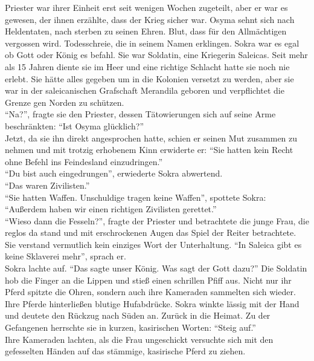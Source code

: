 Priester war ihrer Einheit erst seit wenigen Wochen zugeteilt, aber er war es gewesen, der ihnen 
erzählte, dass der Krieg sicher war. Osyma sehnt sich nach Heldentaten, nach sterben zu seinen 
Ehren. Blut, dass für den Allmächtigen vergossen wird. Todesschreie, die in seinem Namen erklingen. 
Sokra war es egal ob Gott oder König es befahl. Sie war Soldatin, eine Kriegerin Saleicas. Seit 
mehr als 15 Jahren diente sie im Heer und eine richtige Schlacht hatte sie noch nie erlebt. Sie 
hätte alles gegeben um in die Kolonien versetzt zu werden, aber sie war in der saleicanischen 
Grafschaft Merandila geboren und verpflichtet die Grenze gen Norden zu schützen.\\
``Na?'', fragte sie den Priester, dessen Tätowierungen sich auf seine Arme beschränkten: ``Ist 
Osyma glücklich?''\\
Jetzt, da sie ihn direkt angesprochen hatte, schien er seinen Mut zusammen zu nehmen und mit 
trotzig erhobenem Kinn erwiderte er: ``Sie hatten kein Recht ohne Befehl ins Feindesland 
einzudringen.''\\
``Du bist auch eingedrungen'', erwiederte Sokra abwertend.\\
``Das waren Zivilisten.''\\
``Sie hatten Waffen. Unschuldige tragen keine Waffen'', spottete Sokra: ``Außerdem haben wir einen 
richtigen Zivilisten gerettet.''\\
``Wieso dann die Fesseln?'', fragte der Priester und betrachtete die junge Frau, die reglos da 
stand und mit erschrockenen Augen das Spiel der Reiter betrachtete. Sie verstand vermutlich kein 
einziges Wort der Unterhaltung. ``In Saleica gibt es keine Sklaverei mehr'', sprach er.\\
Sokra lachte auf. ``Das sagte unser König. Was sagt der Gott dazu?''
Die Soldatin hob die Finger an die Lippen und stieß einen schrillen Pfiff aus. Nicht nur ihr Pferd 
spitzte die Ohren, sondern auch ihre Kameraden sammelten sich wieder. Ihre Pferde hinterließen 
blutige Hufabdrücke. Sokra winkte lässig mit der Hand und deutete den Rückzug nach Süden an. Zurück 
in die Heimat. Zu der Gefangenen herrschte sie in kurzen, kasirischen Worten: ``Steig auf.''\\
Ihre Kameraden lachten, als die Frau ungeschickt versuchte sich mit den gefesselten Händen auf das 
stämmige, kasirische Pferd zu ziehen. 

